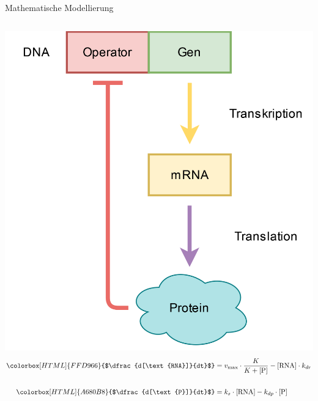 \documentclass[11pt,aspectratio=169,reqno]{beamer}
\begin{document}
\begin{frame}{Mathematische Modellierung}
    \begin{columns}
        \includegraphics[width=\textwidth]{images/repression.png}
        \begin{align*}
            \colorbox[HTML]{FFD966}{$\dfrac{d[\text{RNA}]}{dt}$}&=v_{\text{max}}\cdot\frac{K}{K+[\text{P}]}-[\text{RNA}] \cdot k_{dr}\\[16pt]
            \colorbox[HTML]{A680B8}{$\dfrac{d[\text{P}]}{dt}$}&=k_s\cdot[\text{RNA}]-k_{dp}\cdot[\text{P}]
        \end{align*}
    \end{columns}
\end{frame}
\end{document}

